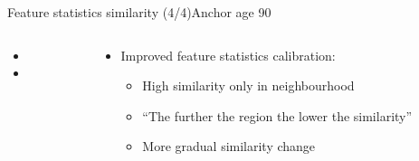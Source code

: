 \begin{frame}{Feature statistics similarity (4/4)}{Anchor age 90}
\begin{columns}
\begin{column}{0.5\textwidth}
\begin{itemize}
				\item {}
				\item {}
			\end{itemize}
		\end{column}
		\begin{column}{0.5\textwidth}
			\begin{itemize}
				\item Improved feature statistics calibration:
				\begin{itemize}
					\vspace{-1.5em}
					\scriptsize
					\item High similarity only in neighbourhood
					\item ``The further the region the lower the similarity''
					\item More gradual similarity change
				\end{itemize}
			\end{itemize}
		\end{column}
	\end{columns}
\end{frame}